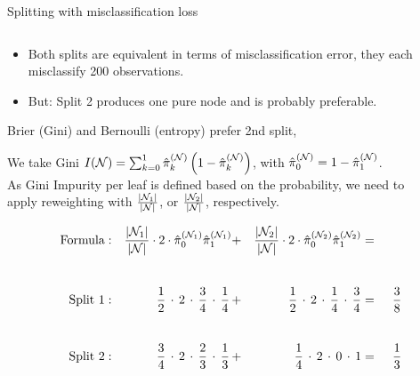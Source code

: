 \documentclass[11pt,compress,t,notes=noshow, xcolor=table]{beamer}
\begin{document}
\begin{vbframe}{Splitting with misclassification loss}
\begin{small}
\begin{columns}[T,onlytextwidth]
\begin{center}
\end{center}
\end{columns}
\end{small}

\lz

\begin{itemize}
\item Both splits are equivalent in terms of misclassification error, they each misclassify 200 observations. 
\item But: Split 2 produces one pure node and is probably preferable.
\end{itemize}

\framebreak


Brier (Gini) and Bernoulli (entropy) prefer 2nd split, \\
\vspace{0.1cm}

We take Gini $I(\Np) = \sum_{k = 0}^1 \pikNh \left( 1-\pikNh \right)$, with $\hat{\pi}_{0}^{(\Np)} = 1 - \hat{\pi}_{1}^{(\Np)}$.\\

\vspace{0.1cm}
As Gini Impurity per leaf is defined based on the probability, we need to \\
\vspace{0.05cm}
apply reweighting with $\frac{|\Nl|}{|\Np|}$, or $\frac{|\Nr|}{|\Np|}$, respectively.

\begin{alignat*}{6}
\text{Formula}&:& \frac{|\Nl|}{|\Np|}\cdot 2 \cdot\pikNlh[0]\pikNlh[1] &+& \frac{|\Nr|}{|\Np|}\cdot 2 \cdot \pikNrh[0]\pikNrh[1] &=& \\[5ex]
\text{Split 1}&:& \,\, \frac{1}{2} \,\cdot \, 2 \,\cdot\, \frac{3}{4} \,\cdot\, \frac{1}{4} \,&+&\,  \, \frac{1}{2} \,\cdot\, 2 \, \cdot\, \frac{1}{4} \,\cdot\, \frac{3}{4} &=&\;\, \frac{3}{8}\\[5ex]
\text{Split 2}&:& \frac{3}{4}\, \cdot\, 2 \,\cdot\,\frac{2}{3}\,\cdot\,\frac{1}{3}\, &+& \frac{1}{4} \,\cdot\, 2 \,\cdot\, 0 \,\cdot\, 1 &=&\; \,\frac{1}{3}
\end{alignat*}
\end{vbframe}




\endlecture
\end{document}
